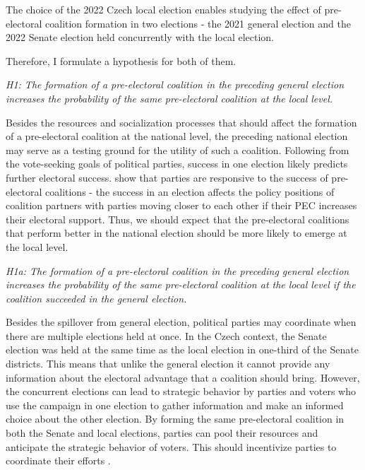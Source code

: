 \documentclass[]{interact}
\theoremstyle{plain}%
\theoremstyle{definition}
\theoremstyle{remark}
\begin{document}
The choice of the 2022 Czech local election enables studying the effect of pre-electoral coalition formation in two elections - the 2021 general election and the 2022 Senate election held concurrently with the local election. 

Therefore, I formulate a hypothesis for both of them.

\vspace{12pt}
\textit{H1: The formation of a pre-electoral coalition in the preceding general election increases the probability of the same pre-electoral coalition at the local level.\label{hyp:1}}
\vspace{12pt}

Besides the resources and socialization processes that should affect the formation of a pre-electoral coalition at the national level, the preceding national election may serve as a testing ground for the utility of such a coalition. Following from the vote-seeking goals of political parties, success in one election likely predicts further electoral success. \citet{greene2017} show that parties are responsive to the success of pre-electoral coalitions - the success in an election affects the policy positions of coalition partners with parties moving closer to each other if their PEC increases their electoral support. Thus, we should expect that the pre-electoral coalitions that perform better in the national election should be more likely to emerge at the local level.  

\vspace{12pt}
\textit{H1a: The formation of a pre-electoral coalition in the preceding general election increases the probability of the same pre-electoral coalition at the local level if the coalition succeeded in the general election.\label{hyp:1.1}}
\vspace{12pt}

Besides the spillover from general election, political parties may coordinate when there are multiple elections held at once. In the Czech context, the Senate election was held at the same time as the local election in one-third of the Senate districts. This means that unlike the general election it cannot provide any information about the electoral advantage that a coalition should bring. However, the concurrent elections can lead to strategic behavior by parties and voters who use the campaign in one election to gather information and make an informed choice about the other election. By forming the same pre-electoral coalition in both the Senate and local elections, parties can pool their resources and anticipate the strategic behavior of voters. This should incentivize parties to coordinate their efforts \citep{hicken2011}. 
\end{document}
